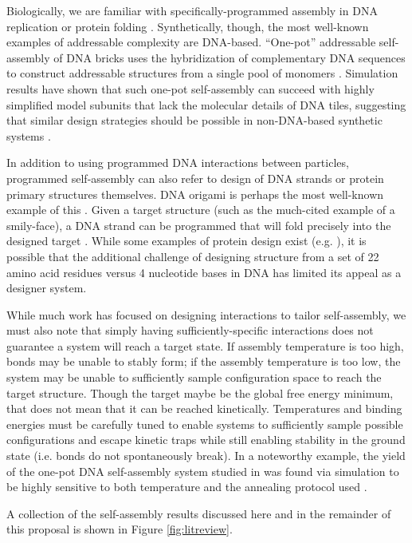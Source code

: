 Biologically, we are familiar with specifically-programmed assembly in DNA replication or protein folding \cite{Dill_1993_CurrOpinStructBiol}.
Synthetically, though, the most well-known examples of addressable complexity are DNA-based.
``One-pot'' addressable self-assembly of DNA bricks uses the hybridization of complementary DNA sequences to construct addressable structures from a single pool of monomers \cite{Ke_2012_Science}.
Simulation results have shown that such one-pot self-assembly can succeed with highly simplified model subunits that lack the molecular details of DNA tiles, suggesting that similar design strategies should be possible in non-DNA-based synthetic systems \cite{Reinhardt_2014_PRL}.

In addition to using programmed DNA interactions between particles, programmed self-assembly can also refer to design of DNA strands or protein primary structures themselves.
DNA origami is perhaps the most well-known example of this \cite{Rothemund_2006_Nature,Winfree_1998_Nature}.
Given a target structure (such as the much-cited example of a smily-face), a DNA strand can be programmed that will fold precisely into the designed target \cite{Rothemund_2006_Nature}.
While some examples of protein design exist (e.g. \cite{Huang_2016_Nature}), it is possible that the additional challenge of designing structure from a set of 22 amino acid residues versus 4 nucleotide bases in DNA has limited its appeal as a designer system.

While much work has focused on designing interactions to tailor self-assembly, we must also note that simply having sufficiently-specific interactions does not guarantee a system will reach a target state.
If assembly temperature is too high, bonds may be unable to stably form; if the assembly temperature is too low, the system may be unable to sufficiently sample configuration space to reach the target structure.
Though the target maybe be the global free energy minimum, that does not mean that it can be reached kinetically.  
Temperatures and binding energies must be carefully tuned to enable systems to sufficiently sample possible configurations and escape kinetic traps while still enabling stability in the ground state (i.e. bonds do not spontaneously break).
In a noteworthy example, the yield of the one-pot DNA self-assembly system studied in \cite{Ke_2012_Science} was found via simulation to be highly sensitive to both temperature \cite{Reinhardt_2014_PRL} and the annealing protocol used \cite{Jacobs_2015_PNAS}. 

A collection of the self-assembly results discussed here and in the remainder of this proposal is shown in Figure \ref{fig:litreview}.
